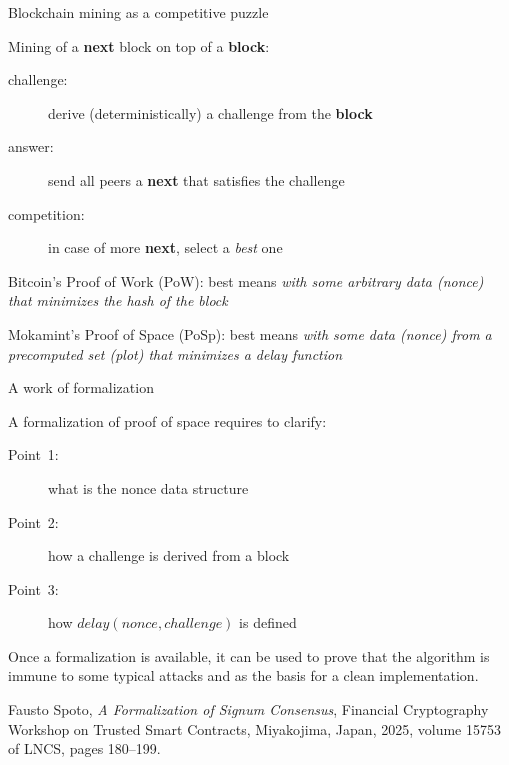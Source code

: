 \documentclass[11pt]{beamer}  %
\newcommand{\nonce}{{\mathit{nonce}}}
\newcommand{\challenge}{{\mathit{challenge}}}
\newcommand{\delay}{{\mathit{delay}}}
\begin{document}
\begin{frame}{Blockchain mining as a competitive puzzle}

  Mining of a \textbf{next} block on top of a \textbf{block}:
  \quad{}

  \begin{description}
  \item[{\color{red}challenge:}] derive (deterministically) a challenge from the \textbf{block}
  \item[{\color{red}answer:}] send all peers a \textbf{next} that satisfies the challenge
  \item[{\color{red}competition:}] in case of more \textbf{next}, select a \emph{best} one
  \end{description}

  \bigskip

  Bitcoin's Proof of Work (PoW): best means \emph{with some arbitrary data (nonce) that minimizes the hash of the block}

  \pause
  \bigskip

  Mokamint's Proof of Space (PoSp): best means \emph{with some data (nonce) from a precomputed set (plot) that minimizes a delay function}

\end{frame}

\begin{frame}{A work of formalization}

  A formalization of proof of space requires to clarify:
  \begin{description}
  \item[Point~1:] what is the nonce data structure
  \item[Point~2:] how a challenge is derived from a block
  \item[Point~3:] how $\delay(\nonce,\challenge)$ is defined
  \end{description}

  \pause

  \medskip

  Once a formalization is available, it can be used to \alert{prove} that
  the algorithm is immune to some typical attacks and as the basis for
  a clean implementation.

  \bigskip

  \begin{greenbox}{}
    Fausto Spoto, \emph{A Formalization of Signum Consensus},
    Financial Cryptography Workshop on Trusted Smart Contracts,
    Miyakojima, Japan, 2025, volume 15753 of LNCS, pages 180--199.
  \end{greenbox}

\end{frame}
\end{document}
